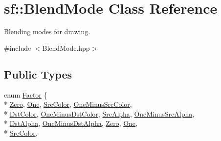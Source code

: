 \hypertarget{structsf_1_1_blend_mode}{\section{sf\-:\-:Blend\-Mode Class Reference}
\label{structsf_1_1_blend_mode}
}


Blending modes for drawing.  




{\ttfamily \#include $<$Blend\-Mode.\-hpp$>$}

\subsection*{Public Types}
\begin{DoxyCompactItemize}
\item 
enum \hyperlink{structsf_1_1_blend_mode_afb9852caf356b53bb0de460c58a9ebbb}{Factor} \{ \\*
\hyperlink{structsf_1_1_blend_mode_afb9852caf356b53bb0de460c58a9ebbba65485893f4abfbf2ae7702f371e003c1}{Zero}, 
\hyperlink{structsf_1_1_blend_mode_afb9852caf356b53bb0de460c58a9ebbba45992876072f707d1565f2d08d6b5ed6}{One}, 
\hyperlink{structsf_1_1_blend_mode_afb9852caf356b53bb0de460c58a9ebbbae3d90dc633cbb883554339e4303f0355}{Src\-Color}, 
\hyperlink{structsf_1_1_blend_mode_afb9852caf356b53bb0de460c58a9ebbbafc9454075ca0b0613f23c9d7d614dca4}{One\-Minus\-Src\-Color}, 
\\*
\hyperlink{structsf_1_1_blend_mode_afb9852caf356b53bb0de460c58a9ebbbabf55ba7b1fd4567def92e4fbfa40387a}{Dst\-Color}, 
\hyperlink{structsf_1_1_blend_mode_afb9852caf356b53bb0de460c58a9ebbbae000102101f7c9828e106c9162ddb69e}{One\-Minus\-Dst\-Color}, 
\hyperlink{structsf_1_1_blend_mode_afb9852caf356b53bb0de460c58a9ebbba8b0cabd5aa52557b385848b8055cb270}{Src\-Alpha}, 
\hyperlink{structsf_1_1_blend_mode_afb9852caf356b53bb0de460c58a9ebbbaf882a5496651c616d7f23cafc8eafe61}{One\-Minus\-Src\-Alpha}, 
\\*
\hyperlink{structsf_1_1_blend_mode_afb9852caf356b53bb0de460c58a9ebbba3344b2d94959aa49f66797bf8046b15b}{Dst\-Alpha}, 
\hyperlink{structsf_1_1_blend_mode_afb9852caf356b53bb0de460c58a9ebbba6f0663bcd2a998b0bb03110fb691ff48}{One\-Minus\-Dst\-Alpha}, 
\hyperlink{structsf_1_1_blend_mode_afb9852caf356b53bb0de460c58a9ebbba65485893f4abfbf2ae7702f371e003c1}{Zero}, 
\hyperlink{structsf_1_1_blend_mode_afb9852caf356b53bb0de460c58a9ebbba45992876072f707d1565f2d08d6b5ed6}{One}, 
\\*
\hyperlink{structsf_1_1_blend_mode_afb9852caf356b53bb0de460c58a9ebbbae3d90dc633cbb883554339e4303f0355}{Src\-Color}, 

\end{DoxyCompactItemize}
